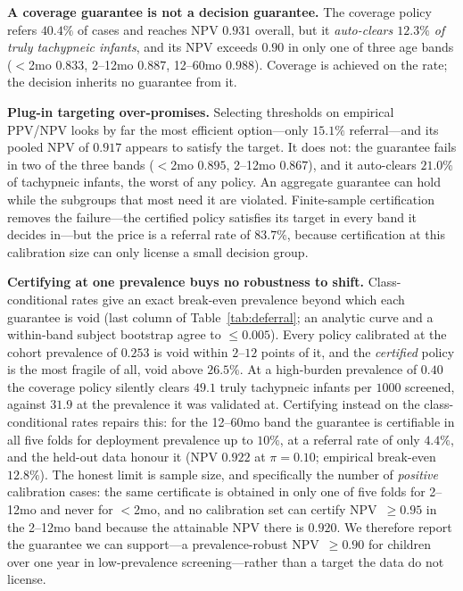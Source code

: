 \textbf{A coverage guarantee is not a decision guarantee.} The coverage policy refers $40.4\%$ of cases
and reaches NPV $0.931$ overall, but it \emph{auto-clears $12.3\%$ of truly tachypneic infants}, and its
NPV exceeds $0.90$ in only one of three age bands ($<$2mo $0.833$, 2--12mo $0.887$, 12--60mo $0.988$).
Coverage is achieved on the rate; the decision inherits no guarantee from it.

\textbf{Plug-in targeting over-promises.} Selecting thresholds on empirical PPV/NPV looks by far the most
efficient option---only $15.1\%$ referral---and its pooled NPV of $0.917$ appears to satisfy the target.
It does not: the guarantee fails in two of the three bands ($<$2mo $0.895$, 2--12mo $0.867$), and it
auto-clears $21.0\%$ of tachypneic infants, the worst of any policy. An aggregate guarantee can hold while
the subgroups that most need it are violated. Finite-sample certification removes the failure---the
certified policy satisfies its target in every band it decides in---but the price is a referral rate of
$83.7\%$, because certification at this calibration size can only license a small decision group.

\textbf{Certifying at one prevalence buys no robustness to shift.} Class-conditional rates give an exact
break-even prevalence beyond which each guarantee is void (last column of Table~\ref{tab:deferral}; an
analytic curve and a within-band subject bootstrap agree to $\le\!0.005$). Every policy calibrated at the
cohort prevalence of $0.253$ is void within $2$--$12$ points of it, and the \emph{certified} policy is the
most fragile of all, void above $26.5\%$. At a high-burden prevalence of $0.40$ the coverage policy silently
clears $49.1$ truly tachypneic infants per $1000$ screened, against $31.9$ at the prevalence it was
validated at. Certifying instead on the class-conditional rates repairs this: for the 12--60mo band the
guarantee is certifiable in all five folds for deployment prevalence up to $10\%$, at a referral rate of
only $4.4\%$, and the held-out data honour it (NPV $0.922$ at $\pi=0.10$; empirical break-even $12.8\%$).
The honest limit is sample size, and specifically the number of \emph{positive} calibration cases: the same
certificate is obtained in only one of five folds for 2--12mo and never for $<$2mo, and no calibration set
can certify NPV~$\ge0.95$ in the 2--12mo band because the attainable NPV there is $0.920$. We therefore
report the guarantee we can support---a prevalence-robust NPV~$\ge0.90$ for children over one year in
low-prevalence screening---rather than a target the data do not license.

